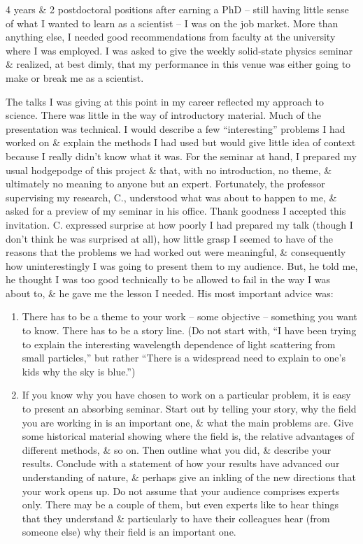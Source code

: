 \documentclass{article}
\begin{document}
\begin{enumerate}
\begin{itemize}
\begin{itemize}
			4 years \& 2 postdoctoral positions after earning a PhD -- still having little sense of what I wanted to learn as a scientist -- I was on the job market. More than anything else, I needed good recommendations from faculty at the university where I was employed. I was asked to give the weekly solid-state physics seminar \& realized, at best dimly, that my performance in this venue was either going to make or break me as a scientist.
			
			The talks I was giving at this point in my career reflected my approach to science. There was little in the way of introductory material. Much of the presentation was technical. I would describe a few ``interesting'' problems I had worked on \& explain the methods I had used but would give little idea of context because I really didn't know what it was. For the seminar at hand, I prepared my usual hodgepodge of this project \& that, with no introduction, no theme, \& ultimately no meaning to anyone but an expert. Fortunately, the professor supervising my research, C., understood what was about to happen to me, \& asked for a preview of my seminar in his office. Thank goodness I accepted this invitation. C. expressed surprise at how poorly I had prepared my talk (though I don't think he was surprised at all), how little grasp I seemed to have of the reasons that the problems we had worked out were meaningful, \& consequently how uninterestingly I was going to present them to my audience. But, he told me, he thought I was too good technically to be allowed to fail in the way I was about to, \& he gave me the lesson I needed. His most important advice was:
			\begin{enumerate}
				\item There has to be a theme to your work -- some objective -- something you want to know. There has to be a story line. (Do not start with, ``I have been trying to explain the interesting wavelength dependence of light scattering from small particles,'' but rather ``There is a widespread need to explain to one's kids why the sky is blue.'')
				\item If you know why you have chosen to work on a particular problem, it is easy to present an absorbing seminar. Start out by telling your story, why the field you are working in is an important one, \& what the main problems are. Give some historical material showing where the field is, the relative advantages of different methods, \& so on. Then outline what you did, \& describe your results. Conclude with a statement of how your results have advanced our understanding of nature, \& perhaps give an inkling of the new directions that your work opens up. Do not assume that your audience comprises experts only. There may be a couple of them, but even experts like to hear things that they understand \& particularly to have their colleagues hear (from someone else) why their field is an important one.

\end{enumerate}
\end{itemize}
\end{itemize}
\end{enumerate}
\end{document}
